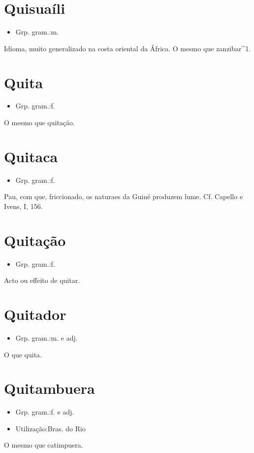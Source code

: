 \section{Quisuaíli}
\begin{itemize}
\item {Grp. gram.:m.}
\end{itemize}
Idioma, muito generalizado na costa oriental da África.
O mesmo que \textunderscore zanzibar\textunderscore ^1.
\section{Quita}
\begin{itemize}
\item {Grp. gram.:f.}
\end{itemize}
O mesmo que \textunderscore quitação\textunderscore .
\section{Quitaca}
\begin{itemize}
\item {Grp. gram.:f.}
\end{itemize}
Pau, com que, friccionado, os naturaes da Guiné produzem lume. Cf. Capello e Ivens, I, 156.
\section{Quitação}
\begin{itemize}
\item {Grp. gram.:f.}
\end{itemize}
Acto ou effeito de quitar.
\section{Quitador}
\begin{itemize}
\item {Grp. gram.:m.  e  adj.}
\end{itemize}
O que quita.
\section{Quitambuera}
\begin{itemize}
\item {Grp. gram.:f.  e  adj.}
\end{itemize}
\begin{itemize}
\item {Utilização:Bras. do Rio}
\end{itemize}
O mesmo que \textunderscore catimpuera\textunderscore .
